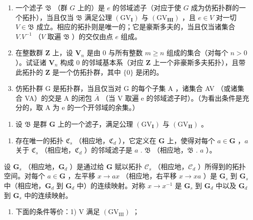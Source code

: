 \begin{enumerate}
\def\labelenumi{\alph{enumi})}
\item
  一个滤子 \(\mathfrak{B}\) （群 \(G\) 上的）是 \(e\) 的邻域滤子（对应于使 \(G\) 成为仿拓扑群的一个拓扑），当且仅当 \(\mathfrak{B}\) 满足公理 \((\mathrm{GV}_{\mathbf{I}})\) 与 \((\mathrm{GV}_{\mathbf{III}})\) ，且 \(e \in V\) 对一切 \(V \in \mathfrak{B}\) 成立。相应的拓扑则是唯一的；它是豪斯多夫的，当且仅当诸集合 \(V.V^{-1}\) （\(V\) 取遍 \(\mathfrak{B}\) ）的交仅由点 \(e\) 组成。
\item
  在整数群 \(\mathbf{Z}\) 上，设 \(\mathbf{V}_n\) 是由 \(0\) 与所有整数 \(m \geqslant n\) 组成的集合（对每个 \(n > 0\) ）。试证诸 \(\mathbf{V}_n\) 构成 \(0\) 的邻域基本系（对应 \(\mathbf{Z}\) 上一个非豪斯多夫拓扑），且带此拓扑的 \(\mathbf{Z}\) 是一个仿拓扑群，其中 \(\{0\}\) 是闭的。
\item
  仿拓扑群 G 是拓扑群，当且仅当对 G 的每个子集 A ，诸集合 AV （或诸集合 VA）的交是 A 的闭包 \(\overline{A}\) （当 V 取遍 e 的邻域滤子时）。（为看出条件是充分的，取 A 为 e 的一个开邻域的余集。）
\end{enumerate}

\begin{enumerate}
\def\labelenumi{\arabic{enumi})}
\setcounter{enumi}{4}
\tightlist
\item
  设 \(\mathfrak{B}\) 是群 \(\mathbf{G}\) 上的一个滤子，满足公理 \((\mathrm{GV}_{\mathbf{I}})\) 与 \((\mathrm{GV}_{\mathbf{II}})\) 。
\end{enumerate}

\begin{enumerate}
\def\labelenumi{\alph{enumi})}
\tightlist
\item
  存在唯一的拓扑 \(\mathfrak{C}_s\) （相应地，\(\mathfrak{C}_d\) ），它定义在 \(\mathbf{G}\) 上，使得对每个 \(a \in \mathbf{G}\) ，\(a\) 关于 \(\mathfrak{C}_s\) （相应地，\(\mathfrak{C}_d\) ）的邻域滤子是 \(a\) . \(\mathfrak{B}\) （相应地，\(\mathfrak{B}\) . \(a\) ）。
\end{enumerate}

设 \(\mathbf{G}_s\) （相应地，\(\mathbf{G}_d\) ）是通过给 \(\mathbf{G}\) 赋以拓扑 \(\mathcal{C}_s\) （相应地，\(\mathcal{C}_d\) ）所得到的拓扑空间。对每个 \(a \in \mathbf{G}\) ，左平移 \(x \to ax\) （相应地，右平移 \(x \to xa\) ）是 \(\mathbf{G}_s\) 到 \(\mathbf{G}_s\) 中（相应地，\(\mathbf{G}_d\) 到 \(\mathbf{G}_d\) 中）的连续映射。对称 \(x \to x^{-1}\) 是 \(\mathbf{G}_s\) 到 \(\mathbf{G}_d\) 中以及 \(\mathbf{G}_d\) 到 \(\mathbf{G}_s\) 中的连续映射。

\begin{enumerate}
\def\labelenumi{\alph{enumi})}
\setcounter{enumi}{1}
\tightlist
\item
  下面的条件等价：1) V 满足 \((\mathrm{GV}_{\mathrm{III}})\) ；
\end{enumerate}

